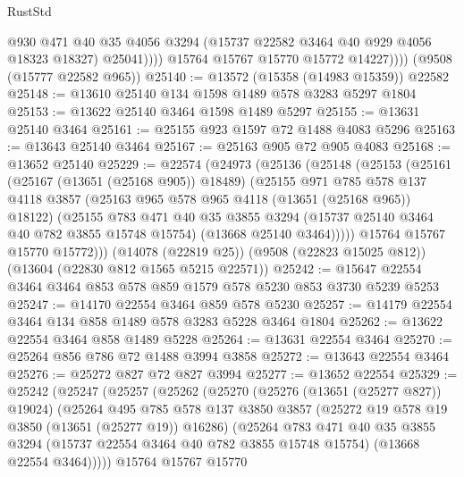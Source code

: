 \begin{lexlean}{RustStd}
\begin{coremodule}
                    @930
                    @471
                    @40
                    @35
                    @4056
                    @3294
                    (@15737 @22582 @3464 @40 @929 @4056 @18323 @18327)
                    @25041))))
            @15764
            @15767
            @15770
            @15772
            @14227))))
    (@9508 (@15777 @22582 @965))
@25140 := @13572 (@15358 (@14983 @15359)) @22582
@25148 := @13610 @25140 @134 @1598 @1489 @578 @3283 @5297 @1804
@25153 := @13622 @25140 @3464 @1598 @1489 @5297
@25155 := @13631 @25140 @3464
@25161 := @25155 @923 @1597 @72 @1488 @4083 @5296
@25163 := @13643 @25140 @3464
@25167 := @25163 @905 @72 @905 @4083
@25168 := @13652 @25140
@25229 := @22574
    (@24973
      (@25136
        (@25148
          (@25153
            (@25161
              (@25167 (@13651 (@25168 @905)) @18489)
              (@25155
                @971
                @785
                @578
                @137
                @4118
                @3857
                (@25163 @965 @578 @965 @4118 (@13651 (@25168 @965)) @18122)
                (@25155
                  @783
                  @471
                  @40
                  @35
                  @3855
                  @3294
                  (@15737 @25140 @3464 @40 @782 @3855 @15748 @15754)
                  (@13668 @25140 @3464)))))
          @15764
          @15767
          @15770
          @15772)))
    (@14078 (@22819 @25))
    (@9508 (@22823 @15025 @812))
    (@13604 (@22830 @812 @1565 @5215 @22571))
@25242 := @15647 @22554 @3464 @3464 @853 @578 @859 @1579 @578 @5230 @853 @3730 @5239 @5253
@25247 := @14170 @22554 @3464 @859 @578 @5230
@25257 := @14179 @22554 @3464 @134 @858 @1489 @578 @3283 @5228 @3464 @1804
@25262 := @13622 @22554 @3464 @858 @1489 @5228
@25264 := @13631 @22554 @3464
@25270 := @25264 @856 @786 @72 @1488 @3994 @3858
@25272 := @13643 @22554 @3464
@25276 := @25272 @827 @72 @827 @3994
@25277 := @13652 @22554
@25329 := @25242
    (@25247
      (@25257
        (@25262
          (@25270
            (@25276 (@13651 (@25277 @827)) @19024)
            (@25264
              @495
              @785
              @578
              @137
              @3850
              @3857
              (@25272 @19 @578 @19 @3850 (@13651 (@25277 @19)) @16286)
              (@25264
                @783
                @471
                @40
                @35
                @3855
                @3294
                (@15737 @22554 @3464 @40 @782 @3855 @15748 @15754)
                (@13668 @22554 @3464)))))
        @15764
        @15767
        @15770

\end{coremodule}
\end{lexlean}
